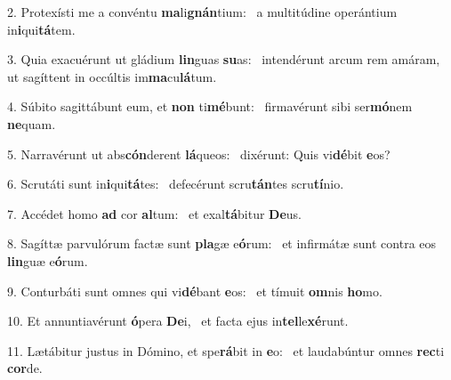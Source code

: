 2. Protexísti me a convéntu \textbf{ma}li\textbf{gnán}tium: \ast\  a multitúdine operántium in\textbf{i}qui\textbf{tá}tem.\

3. Quia exacuérunt ut gládium \textbf{lin}guas \textbf{su}as: \ast\  intendérunt arcum rem amáram, ut sagíttent in occúltis im\textbf{ma}cu\textbf{lá}tum.\

4. Súbito sagittábunt eum, et \textbf{non} ti\textbf{mé}bunt: \ast\  firmavérunt sibi ser\textbf{mó}nem \textbf{ne}quam.\

5. Narravérunt ut abs\textbf{cón}derent \textbf{lá}queos: \ast\  dixérunt: Quis vi\textbf{dé}bit \textbf{e}os?\

6. Scrutáti sunt in\textbf{i}qui\textbf{tá}tes: \ast\  defecérunt scru\textbf{tán}tes scru\textbf{tí}nio.\

7. Accédet homo \textbf{ad} cor \textbf{al}tum: \ast\  et exal\textbf{tá}bitur \textbf{De}us.\

8. Sagíttæ parvulórum factæ sunt \textbf{pla}gæ e\textbf{ó}rum: \ast\  et infirmátæ sunt contra eos \textbf{lin}guæ e\textbf{ó}rum.\

9. Conturbáti sunt omnes qui vi\textbf{dé}bant \textbf{e}os: \ast\  et tímuit \textbf{om}nis \textbf{ho}mo.\

10. Et annuntiavérunt \textbf{ó}pera \textbf{De}i, \ast\  et facta ejus in\textbf{tel}le\textbf{xé}runt.\

11. Lætábitur justus in Dómino, et spe\textbf{rá}bit in \textbf{e}o: \ast\  et laudabúntur omnes \textbf{rec}ti \textbf{cor}de.\

